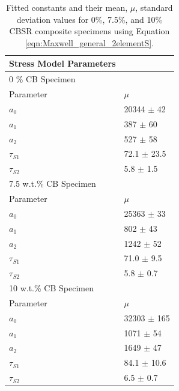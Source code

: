 \begin{table}[H]
	\caption{Fitted constants and their mean, $\mu$, standard deviation values for 0\%, 7.5\%, and 10\% CBSR composite specimens using Equation \ref{eqn:Maxwell_general_2elementS}.}
	\begin{center}
		\label{tab:generalised_model_constants}
		\begin{tabular}{l l}
			\textbf{Stress Model Parameters} & \\ 
			\hline
			0 \% CB Specimen & \\ 
			\hline
			Parameter & $\mu$ \\
			\hline
			$a_0$ & 20344 $\pm$ 42 \\
			$a_1$ & 387 $\pm$ 60 \\
			$a_2$ & 527 $\pm$ 58 \\
			$\tau_{S1}$ & 72.1 $\pm$ 23.5 \\
			$\tau_{S2}$ & 5.8 $\pm$ 1.5 \\
			\hline
			7.5 w.t.\% CB Specimen & \\ 
			\hline
			Parameter & $\mu$ \\
			\hline
			$a_0$ & 25363 $\pm$ 33 \\
			$a_1$ & 802 $\pm$ 43 \\
			$a_2$ & 1242 $\pm$ 52 \\
			$\tau_{S1}$ & 71.0 $\pm$ 9.5 \\
			$\tau_{S2}$ & 5.8 $\pm$ 0.7 \\
			\hline
			10 w.t.\% CB Specimen & \\
			\hline
			Parameter & $\mu$ \\
			\hline
			$a_0$ & 32303 $\pm$ 165 \\
			$a_1$ & 1071 $\pm$ 54 \\
			$a_2$ & 1649 $\pm$ 47 \\
			$\tau_{S1}$ & 84.1 $\pm$ 10.6 \\
			$\tau_{S2}$ & 6.5 $\pm$ 0.7 \\
			\hline
		\end{tabular}
	\end{center}
\end{table}
